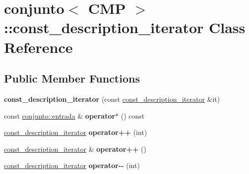 \hypertarget{classconjunto_1_1const__description__iterator}{}\section{conjunto$<$ C\+M\+P $>$\+:\+:const\+\_\+description\+\_\+iterator Class Reference}
\label{classconjunto_1_1const__description__iterator}
\subsection*{Public Member Functions}
\begin{DoxyCompactItemize}
\item 
\hypertarget{classconjunto_1_1const__description__iterator_a75b6b4bb658dcff2513c8d2aede8a5ba}{}{\bfseries const\+\_\+description\+\_\+iterator} (const \hyperlink{classconjunto_1_1const__description__iterator}{const\+\_\+description\+\_\+iterator} \&it)\label{classconjunto_1_1const__description__iterator_a75b6b4bb658dcff2513c8d2aede8a5ba}

\item 
\hypertarget{classconjunto_1_1const__description__iterator_a0a70265ec0f223ffeaccc51ca70a9202}{}const \hyperlink{classconjunto_a7630ace7cb17bcec07daf5804f1a0780}{conjunto\+::entrada} \& {\bfseries operator$\ast$} () const \label{classconjunto_1_1const__description__iterator_a0a70265ec0f223ffeaccc51ca70a9202}

\item 
\hypertarget{classconjunto_1_1const__description__iterator_a8543b7ec20d0b4cad490fe427f152da0}{}\hyperlink{classconjunto_1_1const__description__iterator}{const\+\_\+description\+\_\+iterator} {\bfseries operator++} (int)\label{classconjunto_1_1const__description__iterator_a8543b7ec20d0b4cad490fe427f152da0}

\item 
\hypertarget{classconjunto_1_1const__description__iterator_a7710e8d392d152a3e0a0fec825bb4fc2}{}\hyperlink{classconjunto_1_1const__description__iterator}{const\+\_\+description\+\_\+iterator} \& {\bfseries operator++} ()\label{classconjunto_1_1const__description__iterator_a7710e8d392d152a3e0a0fec825bb4fc2}

\item 
\hypertarget{classconjunto_1_1const__description__iterator_a24e4feb13fb3859d2df19abd5c596b4b}{}\hyperlink{classconjunto_1_1const__description__iterator}{const\+\_\+description\+\_\+iterator} {\bfseries operator-\/-\/} (int)\label{classconjunto_1_1const__description__iterator_a24e4feb13fb3859d2df19abd5c596b4b}


\end{DoxyCompactItemize}
